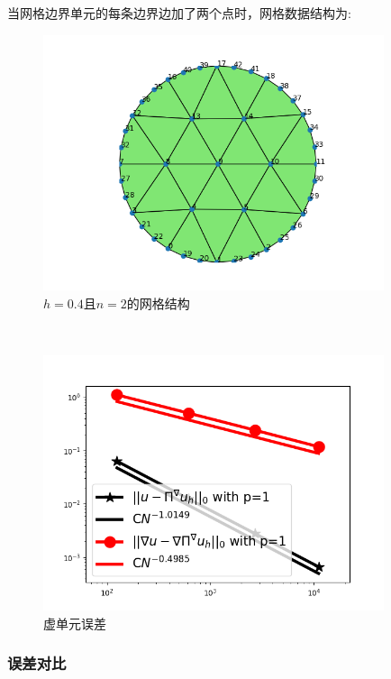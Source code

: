 \documentclass[12pt]{article}
\begin{document}
\begin{CJK}{UTF8}{gkai}
        当网格边界单元的每条边界边加了两个点时，网格数据结构为:\\
        \begin{figure}[H] 
        	\centering
        	\includegraphics[width=10cm]{aa.png}
        	\caption{$h=0.4$且$n=2$的网格结构}
        \end{figure}
        \
         \begin{figure}[H] 
           \centering
           \includegraphics[width=10cm]{10e.png}
           \caption{虚单元误差}
         \end{figure}

             
             \subsubsection{误差对比}           
          

\end{CJK}
\end{document}
